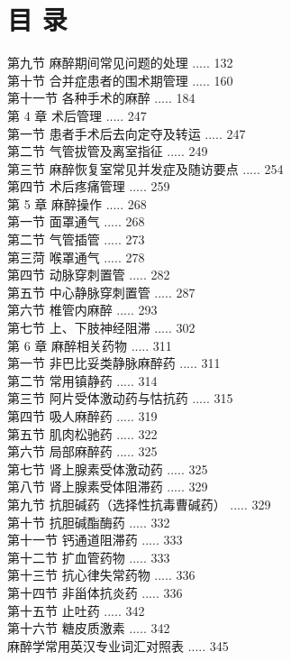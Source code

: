 \documentclass[10pt]{article}
\begin{document}
\section*{目 录}
第九节 麻醉期间常见问题的处理 ..... 132\\
第十节 合并症患者的围术期管理 ..... 160\\
第十一节 各种手术的麻醉 ..... 184\\
第 4 章 术后管理 ..... 247\\
第一节 患者手术后去向定夺及转运 ..... 247\\
第二节 气管拔管及离室指征 ..... 249\\
第三节 麻醉恢复室常见并发症及随访要点 ..... 254\\
第四节 术后疼痛管理 ..... 259\\
第 5 章 麻醉操作 ..... 268\\
第一节 面罩通气 ..... 268\\
第二节 气管插管 ..... 273\\
第三菏 喉罩通气 ..... 278\\
第四节 动脉穿刺置管 ..... 282\\
第五节 中心静脉穿刺置管 ..... 287\\
第六节 椎管内麻醉 ..... 293\\
第七节 上、下肢神经阻滞 ..... 302\\
第 6 章 麻醉相关药物 ..... 311\\
第一节 非巴比妥类静脉麻醉药 ..... 311\\
第二节 常用镇静药 ..... 314\\
第三节 阿片受体激动药与怙抗药 ..... 315\\
第四节 吸人麻醉药 ..... 319\\
第五节 肌肉松驰药 ..... 322\\
第六节 局部麻醉药 ..... 325\\
第七节 肾上腺素受体激动药 ..... 325\\
第八节 肾上腺素受体阻滞药 ..... 329\\
第九节 抗胆碱药（选择性抗毒曹碱药） ..... 329\\
第十节 抗胆碱酯酶药 ..... 332\\
第十一节 钙通道阻滞药 ..... 333\\
第十二节 扩血管药物 ..... 333\\
第十三节 抗心律失常药物 ..... 336\\
第十四节 非甾体抗炎药 ..... 336\\
第十五节 止吐药 ..... 342\\
第十六节 糖皮质激素 ..... 342\\
麻醉学常用英汉专业词汇对照表 ..... 345
\end{document}
